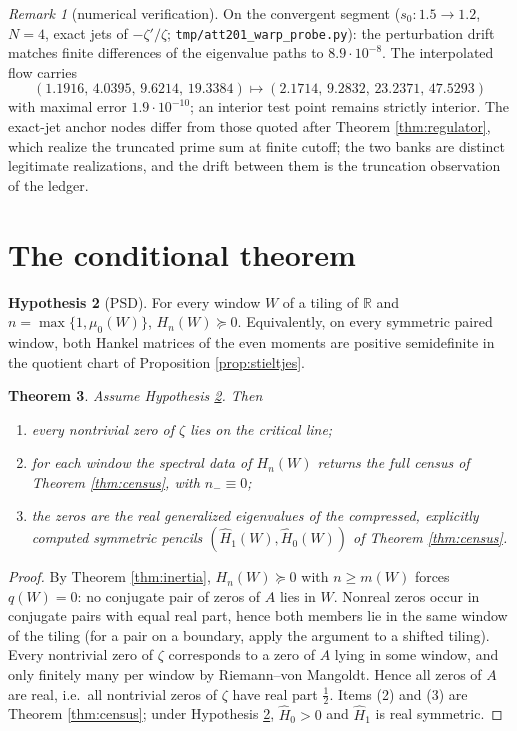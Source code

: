 \documentclass[11pt]{article}
\theoremstyle{plain}
\newtheorem{theorem}{Theorem}
\theoremstyle{definition}
\newtheorem{hypothesis}[theorem]{Hypothesis}
\theoremstyle{remark}
\newtheorem{remark}[theorem]{Remark}
\newcommand{\R}{\mathbb{R}}
\begin{document}
\begin{remark}[numerical verification]
On the convergent segment ($s_0\colon1.5\to1.2$, $N=4$, exact jets of $-\zeta'/\zeta$;
\texttt{tmp/att201\_warp\_probe.py}): the perturbation drift matches finite differences
of the eigenvalue paths to $8.9\cdot10^{-8}$. The interpolated flow carries
\[
 (1.1916,\,4.0395,\,9.6214,\,19.3384)
 \longmapsto
 (2.1714,\,9.2832,\,23.2371,\,47.5293)
\]
with maximal error $1.9\cdot10^{-10}$; an
interior test point remains strictly interior. The exact-jet anchor nodes differ from
those quoted after Theorem \ref{thm:regulator}, which realize the truncated prime sum at
finite cutoff; the two banks are distinct legitimate realizations, and the drift between
them is the truncation observation of the ledger.
\end{remark}

\section{The conditional theorem}

\begin{hypothesis}[$\mathrm{PSD}$]\label{hyp:psd}
For every window $W$ of a tiling of $\R$ and
$n=\max\{1,\mu_0(W)\}$, $H_n(W)\succeq0$. Equivalently, on every symmetric paired
window, both Hankel matrices of the even moments are positive semidefinite in the
quotient chart of Proposition \ref{prop:stieltjes}.
\end{hypothesis}

\begin{theorem}\label{thm:main}
Assume Hypothesis \ref{hyp:psd}. Then
\begin{enumerate}
\item every nontrivial zero of $\zeta$ lies on the critical line;
\item for each window the spectral data of $H_n(W)$ returns the full census of Theorem
\ref{thm:census}, with $n_-\equiv0$;
\item the zeros are the real generalized eigenvalues of the compressed, explicitly
computed symmetric pencils $(\widehat H_1(W),\widehat H_0(W))$ of Theorem
\ref{thm:census}.
\end{enumerate}
\end{theorem}

\begin{proof}
By Theorem \ref{thm:inertia}, $H_n(W)\succeq0$ with $n\ge m(W)$ forces $q(W)=0$: no
conjugate pair of zeros of $A$ lies in $W$. Nonreal zeros occur in conjugate pairs with
equal real part, hence both members lie in the same window of the tiling (for a pair on a
boundary, apply the argument to a shifted tiling). Every nontrivial zero of $\zeta$
corresponds to a zero of $A$ lying in some window, and only finitely many per window by
Riemann--von Mangoldt. Hence all zeros of $A$ are real, i.e.\ all nontrivial zeros of
$\zeta$ have real part $\tfrac12$. Items (2) and (3) are Theorem \ref{thm:census}; under
Hypothesis \ref{hyp:psd}, $\widehat H_0>0$ and $\widehat H_1$ is real symmetric.
\end{proof}
\end{document}
